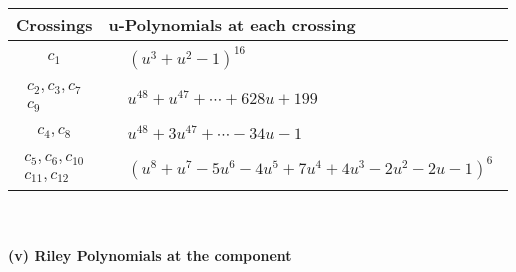 \documentclass[1p]{elsarticle_modified}
\theoremstyle{definition}
\begin{document}
\begin{tabular}{m{50pt}|m{274pt}}
Crossings & \hspace{64pt}u-Polynomials at each crossing \\
\hline $$\begin{aligned}c_{1}\end{aligned}$$&$\begin{aligned}
&(u^3+u^2-1)^{16}
\end{aligned}$\\
\hline $$\begin{aligned}c_{2},c_{3},c_{7}\\c_{9}\end{aligned}$$&$\begin{aligned}
&u^{48}+u^{47}+\cdots+628 u+199
\end{aligned}$\\
\hline $$\begin{aligned}c_{4},c_{8}\end{aligned}$$&$\begin{aligned}
&u^{48}+3 u^{47}+\cdots-34 u-1
\end{aligned}$\\
\hline $$\begin{aligned}c_{5},c_{6},c_{10}\\c_{11},c_{12}\end{aligned}$$&$\begin{aligned}
&(u^8+u^7-5 u^6-4 u^5+7 u^4+4 u^3-2 u^2-2 u-1)^6
\end{aligned}$\\
\hline
\end{tabular}\\~\\
\newpage\renewcommand{\arraystretch}{1}
\flushleft \textbf{(v) Riley Polynomials at the component}\newline \\
\end{document}
